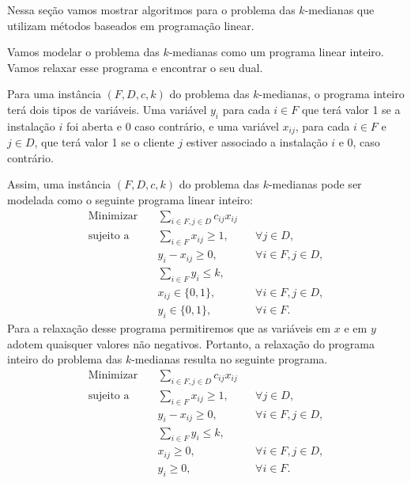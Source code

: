 Nessa seção vamos mostrar algoritmos para o problema das $k$-medianas que utilizam métodos baseados em programação linear.

Vamos modelar o problema das $k$-medianas como um programa linear inteiro. Vamos relaxar esse programa e encontrar o seu dual.

Para uma instância $(F,D,c,k)$ do problema das $k$-medianas, o programa inteiro terá dois tipos de variáveis. Uma variável $y_i$ para cada $i \in F$ que terá valor 1 se a instalação $i$ foi aberta e 0 caso contrário, e uma variável $x_{ij}$, para cada $i \in F$ e $j \in D$, que terá valor 1 se o cliente $j$ estiver associado a instalação $i$ e 0, caso contrário. 

Assim, uma instância $(F,D,c,k)$ do problema das $k$-medianas pode ser modelada como o seguinte programa linear inteiro:
\begin{align*}
\text{Minimizar} \quad & \sum_{i \in F, j \in D} c_{ij}x_{ij} \\
\text{sujeito a} \quad & \sum_{i \in F} x_{ij} \geq 1, &&\forall j \in D, \\
                       & y_i - x_{ij} \geq 0, &&\forall i \in F, j \in D, \\
                       & \sum_{i \in F} y_i \leq k, \\
                       & x_{ij} \in \{0,1\}, && \forall i \in F,j \in D, \\
                       & y_i \in \{0,1\}, &&\forall i \in F. 
\end{align*}
Para a relaxação desse programa permitiremos que as variáveis em $x$ e em $y$ adotem quaisquer valores não negativos. Portanto, a relaxação do programa inteiro do problema das $k$-medianas resulta no seguinte programa.
\begin{align}
    \text{Minimizar} \quad & \sum_{i \in F, j \in D} c_{ij}x_{ij} \label{PL:med} \tag{PL}\\
    \text{sujeito a} \quad & \sum_{i \in F} x_{ij} \geq 1, &&\forall j \in D, \nonumber\\
                           & y_i - x_{ij} \geq 0, &&\forall i \in F, j \in D, \nonumber \\
                           & \sum_{i \in F} y_i \leq k, \label{PL:k-med}\\
                           & x_{ij} \geq 0, && \forall i \in F,j \in D, \nonumber \\
                           & y_i \geq 0, &&\forall i \in F. \nonumber 
\end{align}
